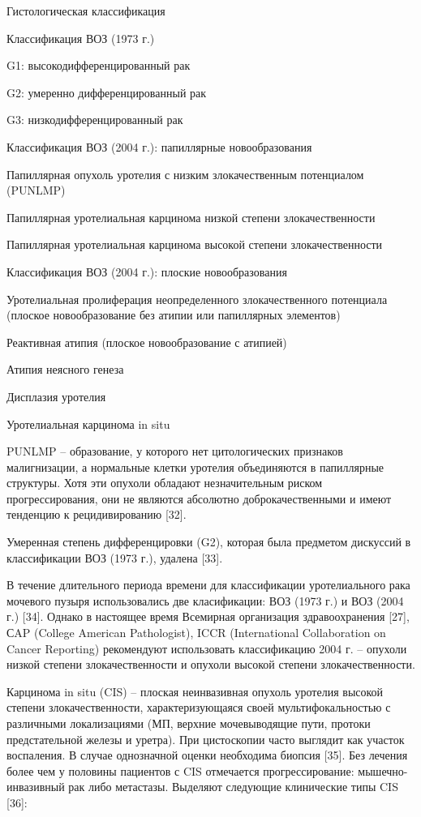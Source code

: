 Гистологическая классификация

Классификация ВОЗ (1973 г.)

G1: высокодифференцированный рак

G2: умеренно дифференцированный рак

G3: низкодифференцированный рак

Классификация ВОЗ (2004 г.): папиллярные новообразования

Папиллярная опухоль уротелия с низким злокачественным потенциалом (PUNLMP)

Папиллярная уротелиальная карцинома низкой степени злокачественности

Папиллярная уротелиальная карцинома высокой степени злокачественности

Классификация ВОЗ (2004 г.): плоские новообразования

Уротелиальная пролиферация неопределенного злокачественного потенциала (плоское новообразование без атипии или папиллярных элементов)

Реактивная атипия (плоское новообразование с атипией)

Атипия неясного генеза

Дисплазия уротелия

Уротелиальная карцинома in situ

PUNLMP – образование, у которого нет цитологических признаков малигнизации, а нормальные клетки уротелия объединяются в папиллярные структуры. Хотя эти опухоли обладают незначительным риском прогрессирования, они не являются абсолютно доброкачественными и имеют тенденцию к рецидивированию [32].

Умеренная степень дифференцировки (G2), которая была предметом дискуссий в классификации ВОЗ (1973 г.), удалена [33].

В течение длительного периода времени для классификации уротелиального рака мочевого пузыря использовались две класификации: ВОЗ (1973 г.) и ВОЗ (2004 г.) [34]. Однако в настоящее время Всемирная организация здравоохранения [27], СAP (College American Pathologist), ICCR (International Collaboration on Cancer Reporting) рекомендуют использовать классификацию 2004 г. – опухоли низкой степени злокачественности и опухоли высокой степени злокачественности.

Карцинома in situ (CIS) – плоская неинвазивная опухоль уротелия высокой степени злокачественности, характеризующаяся своей мультифокальностью с различными локализациями (МП, верхние мочевыводящие пути, протоки предстательной железы и уретра). При цистоскопии часто выглядит как участок воспаления. В случае однозначной оценки необходима биопсия [35]. Без лечения более чем у половины пациентов с CIS отмечается прогрессирование: мышечно-инвазивный рак либо метастазы. Выделяют следующие клинические типы CIS [36]:


